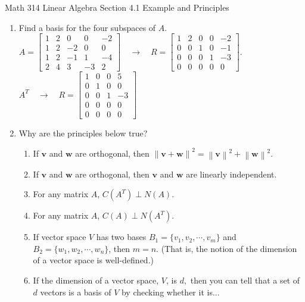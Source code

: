\documentclass[12pt]{amsart}
\newcommand{\bv}{\mathbf{v}}
\newcommand{\bw}{\mathbf{w}}
\begin{document}
\scriptsize \noindent Math 314 Linear Algebra \hfill Section 4.1 Example and Principles 
\normalsize\medskip


\thispagestyle{empty}
\begin{enumerate}
\item Find a basis for the four subspaces of $A.$ \\

$A =  \begin{bmatrix} 1 & 2 & 0 &0&-2\\ 
1 & 2 & -2&0&0 \\ 1 & 2 & -1&1&-4 \\2&4&3&-3&2\end{bmatrix} 
\quad \to \quad R = \begin{bmatrix} 1 &2&0& 0 & -2 \\0& 0 & 1 & 0&-1 \\ 0 & 0 & 0&1&-3 \\ 0&0&0&0&0  \end{bmatrix}.$\\

$A^{T} \quad \to \quad R = \begin{bmatrix} 1 &0& 0 & 5 \\0 & 1 & 0&0 \\ 0 & 0 &1&-3 \\ 0&0&0&0 \\ 0&0&0&0  \end{bmatrix}$\\
\vfill
\item Why are the principles below true?
	\begin{enumerate}
	\item If $\bv$ and $\bw$ are orthogonal, then $ \left\lVert \bv + \bw \right\rVert^2=\left\lVert \bv \right\rVert^2+ \left\lVert\bw \right\rVert^2.$
	\vspace{.75in}
	\item If $\bv$ and $\bw$ are orthogonal, then $\bv$ and $\bw$ are linearly independent.
	\vspace{.75in}
\newpage

	\item For any matrix $A$, $C(A^T) \perp N(A).$ 
	\vfill
	
	\vfill
	\item For any matrix $A$, $C(A) \perp N(A^T).$
	\vspace{.5in}
	\item If vector space $V$ has two bases $B_1=\{v_1,v_2,\cdots,v_m\}$ and $B_2 = \{w_1,w_2,\cdots, w_n\}$, then $m=n.$ (That is, the notion of the dimension of a vector space is well-defined.)
	\vfill
	\vfill
	\item  If the dimension of a vector space, $V$, is $d,$ then you can tell that a set of $d$ vectors is a basis of $V$ by checking whether it is...
\vfill
	\end{enumerate}
\end{enumerate}
\end{document}
